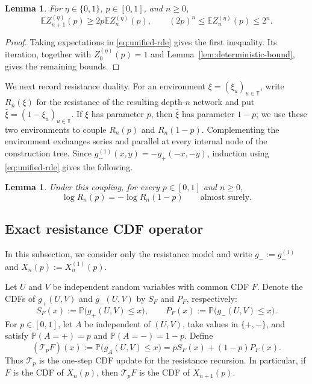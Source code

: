 \documentclass[a4paper,fleqn]{cas-sc}
\numberwithin{equation}{section}
\theoremstyle{plain}
\newtheorem{lemma}[theorem]{Lemma}
\theoremstyle{definition}
\newcommand{\E}{\mathbb E}
\newcommand{\Pp}{\mathbb P}
\begin{document}
\begin{lemma}
\label{lem:first-moment-bounds}
For $\eta\in\{0,1\}$, $p\in[0,1]$, and $n\ge0$,
\begin{equation}
 \E Z_{n+1}^{(\eta)}(p)\ge2p\E Z_n^{(\eta)}(p),
 \qquad
 (2p)^n\le\E Z_n^{(\eta)}(p)\le2^n.
 \label{eq:first-moment-recursion}
\end{equation}
\end{lemma}

\begin{proof}
Taking expectations in \eqref{eq:unified-rde} gives the first inequality.
Its iteration, together with $Z_0^{(\eta)}(p)=1$ and
Lemma~\ref{lem:deterministic-bound}, gives the remaining bounds.
\end{proof}

We next record resistance duality.  For an
environment $\xi=(\xi_u)_{u\in\mathbb T}$, write $R_n(\xi)$ for the
resistance of the resulting depth-$n$ network and put
$\bar\xi=(1-\xi_u)_{u\in\mathbb T}$.  If $\xi$ has parameter $p$, then
$\bar\xi$ has parameter $1-p$; we use these two environments to couple
$R_n(p)$ and $R_n(1-p)$.  Complementing the environment exchanges series
and parallel at every internal node of the construction tree.  Since
$g_-^{(1)}(x,y)=-g_+(-x,-y)$, induction using
\eqref{eq:unified-rde} gives the following.

\begin{lemma}
\label{lem:resistance-duality}
Under this coupling, for every $p\in[0,1]$ and $n\ge0$,
\begin{equation}
 \log R_n(p)=-\log R_n(1-p)
 \qquad\text{almost surely}.
 \label{eq:resistance-duality}
\end{equation}
\end{lemma}

\subsection{Exact resistance CDF operator}
\label{sec:cdf-operator}

In this subsection, we consider only the resistance model and write
$g_-:=g_-^{(1)}$ and $X_n(p):=X_n^{(1)}(p)$.

Let $U$ and $V$ be independent random variables with common CDF $F$.  Denote
the CDFs of $g_+(U,V)$ and $g_-(U,V)$ by $S_F$ and $P_F$, respectively:
\[
 S_F(x):=\Pp\bigl(g_+(U,V)\le x\bigr),
 \qquad
 P_F(x):=\Pp\bigl(g_-(U,V)\le x\bigr).
\]
For $p\in[0,1]$, let $A$ be independent of $(U,V)$, take values in
$\{+,-\}$, and satisfy $\Pp(A=+)=p$ and $\Pp(A=-)=1-p$.  Define
\begin{equation}
 (\mathcal T_pF)(x):=\Pp\bigl(g_A(U,V)\le x\bigr)
 =pS_F(x)+(1-p)P_F(x).
 \label{eq:CDF-operator-definition}
\end{equation}
Thus $\mathcal T_p$ is the one-step CDF update for the resistance recursion.
In particular, if $F$ is the CDF of $X_n(p)$, then $\mathcal T_pF$ is the
CDF of $X_{n+1}(p)$.
\end{document}
